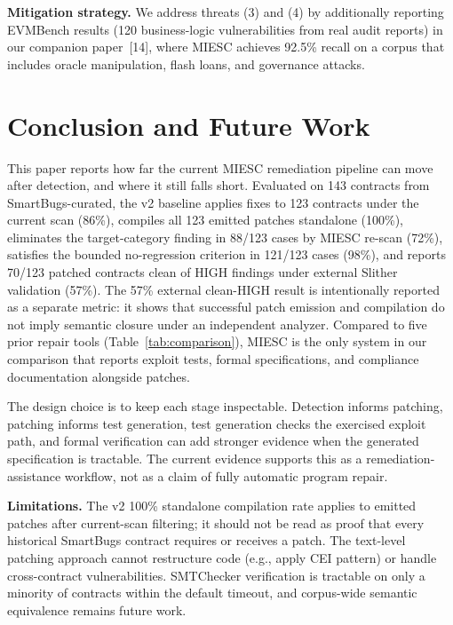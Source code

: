 \documentclass[conference]{IEEEtran}
\begin{document}
\textbf{Mitigation strategy.} We address threats (3) and (4) by additionally reporting EVMBench results (120 business-logic vulnerabilities from real audit reports) in our companion paper~[14], where MIESC achieves 92.5\% recall on a corpus that includes oracle manipulation, flash loans, and governance attacks.

\section{Conclusion and Future Work}

This paper reports how far the current MIESC remediation pipeline can move after detection, and where it still falls short. Evaluated on 143 contracts from SmartBugs-curated, the v2 baseline applies fixes to 123 contracts under the current scan (86\%), compiles all 123 emitted patches standalone (100\%), eliminates the target-category finding in 88/123 cases by MIESC re-scan (72\%), satisfies the bounded no-regression criterion in 121/123 cases (98\%), and reports 70/123 patched contracts clean of HIGH findings under external Slither validation (57\%). The 57\% external clean-HIGH result is intentionally reported as a separate metric: it shows that successful patch emission and compilation do not imply semantic closure under an independent analyzer. Compared to five prior repair tools (Table~\ref{tab:comparison}), MIESC is the only system in our comparison that reports exploit tests, formal specifications, and compliance documentation alongside patches.

The design choice is to keep each stage inspectable. Detection informs patching, patching informs test generation, test generation checks the exercised exploit path, and formal verification can add stronger evidence when the generated specification is tractable. The current evidence supports this as a remediation-assistance workflow, not as a claim of fully automatic program repair.

\textbf{Limitations.} The v2 100\% standalone compilation rate applies to emitted patches after current-scan filtering; it should not be read as proof that every historical SmartBugs contract requires or receives a patch. The text-level patching approach cannot restructure code (e.g., apply CEI pattern) or handle cross-contract vulnerabilities. SMTChecker verification is tractable on only a minority of contracts within the default timeout, and corpus-wide semantic equivalence remains future work.
\end{document}
